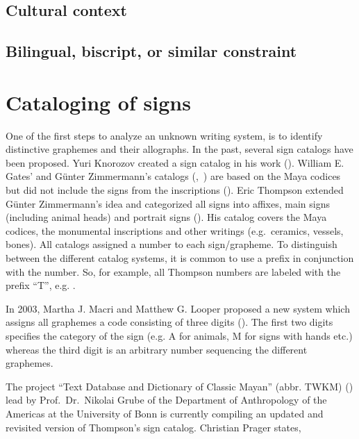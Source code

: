 \documentclass[../main.tex]{subfiles}
\begin{document}
\subsection{Cultural context}

\subsection{Bilingual, biscript, or similar constraint}


\section{Cataloging of signs}
One of the first steps to analyze an unknown writing system, is to identify distinctive graphemes 
and their allographs. 
In the past, several sign catalogs have been proposed.
Yuri Knorozov created a sign catalog in his work (\cite[109\psq]{knorozov1967}).
William E. Gates' and G\"unter Zimmermann's catalogs (\cite{gates1931},~\cite{zimmermann1956}) are 
based on the Maya codices but did not include the signs from the inscriptions 
(\cite[4]{thompson1962catalog}). 
Eric Thompson extended G\"unter Zimmermann's idea and categorized all signs into affixes, main signs 
(including animal heads) and portrait signs (\cite[4]{thompson1962catalog}).
His catalog covers the Maya codices, the monumental inscriptions and other writings 
(e.g.\ ceramics, vessels, bones).
All catalogs assigned a number to each sign/grapheme.
To distinguish between the different catalog systems, it is common to use a prefix in 
conjunction with the number.
So, for example, all Thompson numbers are labeled with the prefix ``T'', e.g. .

In 2003, Martha J. Macri and Matthew G. Looper proposed a new system which assigns all graphemes
a code consisting of three digits (\cite[21,25]{macrilooper2003}).
The first two digits specifies the category of the sign 
(e.g. A for animals, M for signs with hands etc.) whereas the third digit is an arbitrary number
sequencing the different graphemes.

The project ``Text Database and Dictionary of Classic Mayan'' (abbr. TWKM) (\cite{twkm2014}) lead by 
Prof.\ Dr.\ Nikolai Grube of the Department of Anthropology of the Americas at the University of 
Bonn is currently compiling an updated and revisited version of Thompson's sign catalog.
Christian Prager states, 
\end{document}
